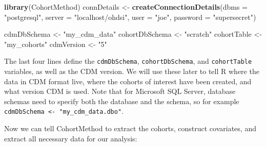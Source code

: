 \documentclass[11pt]{book}
\newenvironment{Shaded}{\begin{snugshade}}{\end{snugshade}}
\newcommand{\DataTypeTok}[1]{\textcolor[rgb]{0.13,0.29,0.53}{#1}}
\newcommand{\KeywordTok}[1]{\textcolor[rgb]{0.13,0.29,0.53}{\textbf{#1}}}
\newcommand{\NormalTok}[1]{#1}
\newcommand{\StringTok}[1]{\textcolor[rgb]{0.31,0.60,0.02}{#1}}
\theoremstyle{definition}
\theoremstyle{definition}
\theoremstyle{definition}
\theoremstyle{remark}
\begin{document}
\begin{Shaded}
\begin{Highlighting}[]
\KeywordTok{library}\NormalTok{(CohortMethod)}
\NormalTok{connDetails <-}\StringTok{ }\KeywordTok{createConnectionDetails}\NormalTok{(}\DataTypeTok{dbms =} \StringTok{"postgresql"}\NormalTok{,}
                                       \DataTypeTok{server =} \StringTok{"localhost/ohdsi"}\NormalTok{,}
                                       \DataTypeTok{user =} \StringTok{"joe"}\NormalTok{,}
                                       \DataTypeTok{password =} \StringTok{"supersecret"}\NormalTok{)}

\NormalTok{cdmDbSchema <-}\StringTok{ "my_cdm_data"}
\NormalTok{cohortDbSchema <-}\StringTok{ "scratch"}
\NormalTok{cohortTable <-}\StringTok{ "my_cohorts"}
\NormalTok{cdmVersion <-}\StringTok{ "5"}
\end{Highlighting}
\end{Shaded}

The last four lines define the \texttt{cdmDbSchema}, \texttt{cohortDbSchema}, and \texttt{cohortTable} variables, as well as the CDM version. We will use these later to tell R where the data in CDM format live, where the cohorts of interest have been created, and what version CDM is used. Note that for Microsoft SQL Server, database schemas need to specify both the database and the schema, so for example \texttt{cdmDbSchema\ \textless{}-\ "my\_cdm\_data.dbo"}.

Now we can tell CohortMethod to extract the cohorts, construct covariates, and extract all necessary data for our analysis:
\end{document}
